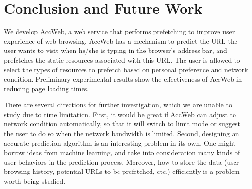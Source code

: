 \section{Conclusion and Future Work}
\label{sec:conclusion}

We develop AccWeb, a web service that performs prefetching to improve user experience of web browsing. AccWeb has a mechanism to predict the URL the user wants to visit when he/she is typing in the browser's address bar, and prefetches the static resources associated with this URL. The user is allowed to select the types of resources to prefetch based on personal preference and network condition. Preliminary experimental results show the effectiveness of AccWeb in reducing page loading times.

There are several directions for further investigation, which we are unable to study due to time limitation. First, it would be great if AccWeb can adjust to network condition automatically, so that it will switch to limit mode or suggest the user to do so when the network bandwidth is limited. Second, designing an accurate prediction algorithm is an interesting problem in its own. One might borrow ideas from machine learning, and take into consideration many kinds of user behaviors in the prediction process. Moreover, how to store the data (user browsing history, potential URLs to be prefetched, etc.) efficiently is a problem worth being studied.
